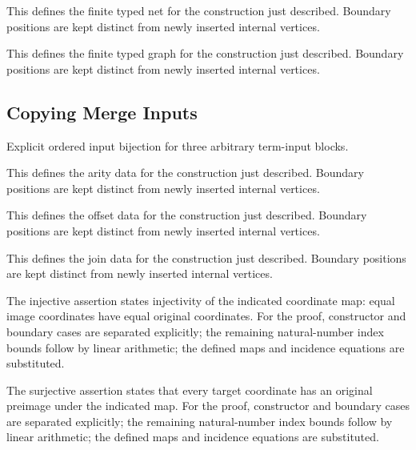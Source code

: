 This defines the finite typed net for the construction just described. Boundary positions are kept distinct from newly inserted internal vertices.
\par{}

This defines the finite typed graph for the construction just described. Boundary positions are kept distinct from newly inserted internal vertices.
\par{}

\subsection{Copying Merge Inputs}
Explicit ordered input bijection for three arbitrary term-input blocks.

This defines the arity data for the construction just described. Boundary positions are kept distinct from newly inserted internal vertices.
\par{}

This defines the offset data for the construction just described. Boundary positions are kept distinct from newly inserted internal vertices.
\par{}

This defines the join data for the construction just described. Boundary positions are kept distinct from newly inserted internal vertices.
\par{}

The injective assertion states injectivity of the indicated coordinate map: equal image coordinates have equal original coordinates.
For the proof, constructor and boundary cases are separated explicitly; the remaining natural-number index bounds follow by linear arithmetic; the defined maps and incidence equations are substituted.
\par{}

The surjective assertion states that every target coordinate has an original preimage under the indicated map.
For the proof, constructor and boundary cases are separated explicitly; the remaining natural-number index bounds follow by linear arithmetic; the defined maps and incidence equations are substituted.
\par{}

